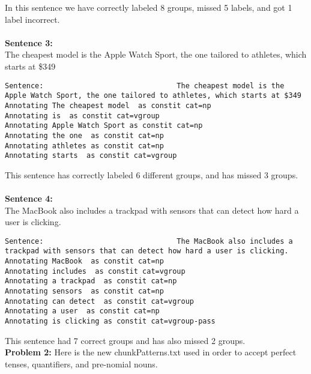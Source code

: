 \documentclass{article}
\begin{document}
In this sentence we have correctly labeled 8 groups, missed 5 labels, and got 1 label incorrect.
\\
\\
\textbf{Sentence 3: }\\
The cheapest model is the Apple Watch Sport, the one tailored to athletes, which starts at \$349

\begin{verbatim}
Sentence:                               The cheapest model is the Apple Watch Sport, the one tailored to athletes, which starts at $349
Annotating The cheapest model  as constit cat=np
Annotating is  as constit cat=vgroup
Annotating Apple Watch Sport as constit cat=np
Annotating the one  as constit cat=np
Annotating athletes as constit cat=np
Annotating starts  as constit cat=vgroup
\end{verbatim}

This sentence has correctly labeled 6 different groups, and has missed 3 groups.
\\
\\
\textbf{Sentence 4:  }\\
The MacBook also includes a trackpad with sensors that can detect how hard a user is clicking.
\begin{verbatim}
Sentence:                               The MacBook also includes a trackpad with sensors that can detect how hard a user is clicking.
Annotating MacBook  as constit cat=np
Annotating includes  as constit cat=vgroup
Annotating a trackpad  as constit cat=np
Annotating sensors  as constit cat=np
Annotating can detect  as constit cat=vgroup
Annotating a user  as constit cat=np
Annotating is clicking as constit cat=vgroup-pass
\end{verbatim}

This sentence had 7 correct groups and has also missed 2 groups.
\\
\newpage
\textbf{Problem 2: }
Here is the new chunkPatterns.txt used in order to accept perfect tenses, quantifiers, and pre-nomial nouns.
\end{document}
